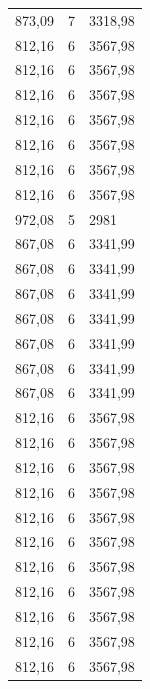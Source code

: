 \begin{center}
\begin{longtable}{|l|l|l|}
873,09            & 7                & 3318,98        \\
812,16            & 6                & 3567,98        \\
812,16            & 6                & 3567,98        \\
812,16            & 6                & 3567,98        \\
812,16            & 6                & 3567,98        \\
812,16            & 6                & 3567,98        \\
812,16            & 6                & 3567,98        \\
812,16            & 6                & 3567,98        \\
972,08            & 5                & 2981           \\
867,08            & 6                & 3341,99        \\
867,08            & 6                & 3341,99        \\
867,08            & 6                & 3341,99        \\
867,08            & 6                & 3341,99        \\
867,08            & 6                & 3341,99        \\
867,08            & 6                & 3341,99        \\
867,08            & 6                & 3341,99        \\
812,16            & 6                & 3567,98        \\
812,16            & 6                & 3567,98        \\
812,16            & 6                & 3567,98        \\
812,16            & 6                & 3567,98        \\
812,16            & 6                & 3567,98        \\
812,16            & 6                & 3567,98        \\
812,16            & 6                & 3567,98        \\
812,16            & 6                & 3567,98        \\
812,16            & 6                & 3567,98        \\
812,16            & 6                & 3567,98        \\
812,16            & 6                & 3567,98        \\

\end{longtable}
\end{center}
